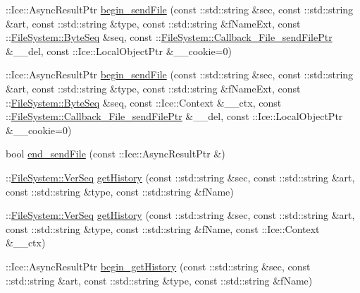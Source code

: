 \begin{DoxyCompactItemize}
\item 
\+::Ice\+::\+Async\+Result\+Ptr \hyperlink{class_ice_proxy_1_1_file_system_1_1_file_a954ec3abdc5196ed1397c1c230be466c}{begin\+\_\+send\+File} (const \+::std\+::string \&sec, const \+::std\+::string \&art, const \+::std\+::string \&type, const \+::std\+::string \&f\+Name\+Ext, const \+::\hyperlink{namespace_file_system_a5c85de065f9c451ae1d1dea2dacb68c5}{File\+System\+::\+Byte\+Seq} \&seq, const \+::\hyperlink{namespace_file_system_aa10040959d9776f7f500f38a2567b56e}{File\+System\+::\+Callback\+\_\+\+File\+\_\+send\+File\+Ptr} \&\+\_\+\+\_\+del, const \+::Ice\+::\+Local\+Object\+Ptr \&\+\_\+\+\_\+cookie=0)
\item 
\+::Ice\+::\+Async\+Result\+Ptr \hyperlink{class_ice_proxy_1_1_file_system_1_1_file_af6424fc76be5433e6eb9de590309726b}{begin\+\_\+send\+File} (const \+::std\+::string \&sec, const \+::std\+::string \&art, const \+::std\+::string \&type, const \+::std\+::string \&f\+Name\+Ext, const \+::\hyperlink{namespace_file_system_a5c85de065f9c451ae1d1dea2dacb68c5}{File\+System\+::\+Byte\+Seq} \&seq, const \+::Ice\+::\+Context \&\+\_\+\+\_\+ctx, const \+::\hyperlink{namespace_file_system_aa10040959d9776f7f500f38a2567b56e}{File\+System\+::\+Callback\+\_\+\+File\+\_\+send\+File\+Ptr} \&\+\_\+\+\_\+del, const \+::Ice\+::\+Local\+Object\+Ptr \&\+\_\+\+\_\+cookie=0)
\item 
bool \hyperlink{class_ice_proxy_1_1_file_system_1_1_file_aa3ce8b0bcafb195f706ac79732566695}{end\+\_\+send\+File} (const \+::Ice\+::\+Async\+Result\+Ptr \&)
\item 
\+::\hyperlink{namespace_file_system_ac32dc1eb34c060160b52edc7c4e37d6e}{File\+System\+::\+Ver\+Seq} \hyperlink{class_ice_proxy_1_1_file_system_1_1_file_aa210a366a64a16ed7e4a484f9f4ee93f}{get\+History} (const \+::std\+::string \&sec, const \+::std\+::string \&art, const \+::std\+::string \&type, const \+::std\+::string \&f\+Name)
\item 
\+::\hyperlink{namespace_file_system_ac32dc1eb34c060160b52edc7c4e37d6e}{File\+System\+::\+Ver\+Seq} \hyperlink{class_ice_proxy_1_1_file_system_1_1_file_ac5c5072e4bd9b5524178af3c5f4dfec6}{get\+History} (const \+::std\+::string \&sec, const \+::std\+::string \&art, const \+::std\+::string \&type, const \+::std\+::string \&f\+Name, const \+::Ice\+::\+Context \&\+\_\+\+\_\+ctx)
\item 
\+::Ice\+::\+Async\+Result\+Ptr \hyperlink{class_ice_proxy_1_1_file_system_1_1_file_a3f3e75a2fe26435cf701d5baaaad95bd}{begin\+\_\+get\+History} (const \+::std\+::string \&sec, const \+::std\+::string \&art, const \+::std\+::string \&type, const \+::std\+::string \&f\+Name)

\end{DoxyCompactItemize}
